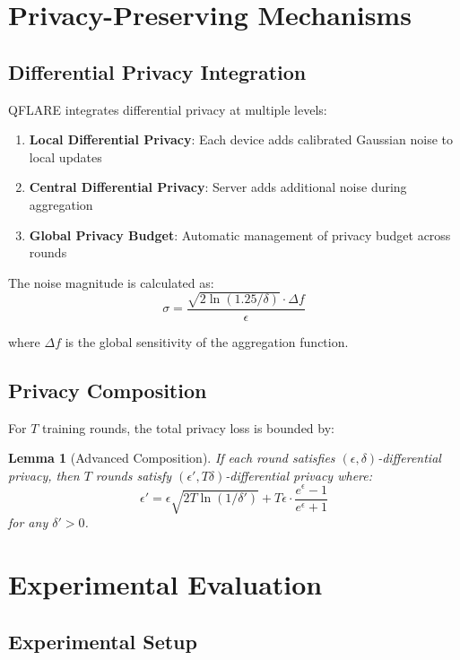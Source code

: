 \documentclass[journal,onecolumn,draftclsnofoot]{IEEEtran}
\newtheorem{lemma}{Lemma}
\begin{document}
\section{Privacy-Preserving Mechanisms}

\subsection{Differential Privacy Integration}

QFLARE integrates differential privacy at multiple levels:

\begin{enumerate}
\item \textbf{Local Differential Privacy}: Each device adds calibrated Gaussian noise to local updates
\item \textbf{Central Differential Privacy}: Server adds additional noise during aggregation
\item \textbf{Global Privacy Budget}: Automatic management of privacy budget across rounds
\end{enumerate}

The noise magnitude is calculated as:
$$\sigma = \frac{\sqrt{2\ln(1.25/\delta)} \cdot \Delta f}{\epsilon}$$

where $\Delta f$ is the global sensitivity of the aggregation function.

\subsection{Privacy Composition}

For $T$ training rounds, the total privacy loss is bounded by:

\begin{lemma}[Advanced Composition]
If each round satisfies $(\epsilon, \delta)$-differential privacy, then $T$ rounds satisfy $(\epsilon', T\delta)$-differential privacy where:
$$\epsilon' = \epsilon\sqrt{2T\ln(1/\delta')} + T\epsilon \cdot \frac{e^\epsilon - 1}{e^\epsilon + 1}$$
for any $\delta' > 0$.
\end{lemma}

\section{Experimental Evaluation}

\subsection{Experimental Setup}
\end{document}
